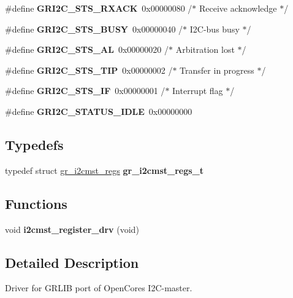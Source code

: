 \begin{DoxyCompactItemize}
\#define {\bfseries G\+R\+I2\+C\+\_\+\+S\+T\+S\+\_\+\+R\+X\+A\+CK}~0x00000080 /$\ast$ Receive acknowledge $\ast$/
\item 
\mbox{\label{group__i2c_ga491b264824fa300aba3bed5e3fbd6b79}} 
\#define {\bfseries G\+R\+I2\+C\+\_\+\+S\+T\+S\+\_\+\+B\+U\+SY}~0x00000040 /$\ast$ I2\+C-\/bus busy $\ast$/
\item 
\mbox{\label{group__i2c_ga488faf7d8582278524264f4ee466f28f}} 
\#define {\bfseries G\+R\+I2\+C\+\_\+\+S\+T\+S\+\_\+\+AL}~0x00000020 /$\ast$ Arbitration lost $\ast$/
\item 
\mbox{\label{group__i2c_gafb74fcd051c7abccf29429aa97ec705e}} 
\#define {\bfseries G\+R\+I2\+C\+\_\+\+S\+T\+S\+\_\+\+T\+IP}~0x00000002 /$\ast$ Transfer in progress $\ast$/
\item 
\mbox{\label{group__i2c_gaccdf78914c0811f8fb5350268c9fff2b}} 
\#define {\bfseries G\+R\+I2\+C\+\_\+\+S\+T\+S\+\_\+\+IF}~0x00000001 /$\ast$ Interrupt flag $\ast$/
\item 
\mbox{\label{group__i2c_ga01fa4b9bb13796fc9759ed8b6a994977}} 
\#define {\bfseries G\+R\+I2\+C\+\_\+\+S\+T\+A\+T\+U\+S\+\_\+\+I\+D\+LE}~0x00000000
\end{DoxyCompactItemize}
\subsection*{Typedefs}
\begin{DoxyCompactItemize}
\item 
\mbox{\label{group__i2c_gae9a7d26ee42f40fbc0bb59801b7891e6}} 
typedef struct \mbox{\hyperlink{structgr__i2cmst__regs}{gr\+\_\+i2cmst\+\_\+regs}} {\bfseries gr\+\_\+i2cmst\+\_\+regs\+\_\+t}
\end{DoxyCompactItemize}
\subsection*{Functions}
\begin{DoxyCompactItemize}
\item 
\mbox{\label{group__i2c_ga32482d5912169dcbb8955451d1f697e7}} 
void {\bfseries i2cmst\+\_\+register\+\_\+drv} (void)
\end{DoxyCompactItemize}


\subsection{Detailed Description}
Driver for G\+R\+L\+IB port of Open\+Cores I2\+C-\/master. 

